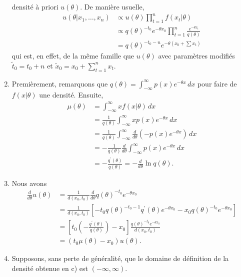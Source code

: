 \begin{exercice}
\begin{sol}
\begin{enumerate}
      densité à priori $u(\theta)$. De manière usuelle,
      \begin{align*}
        u(\theta|x_1, \dots, x_n)
        &\propto u(\theta) \prod_{t=1}^n f(x_t|\theta) \\
        &\propto q(\theta)^{-t_0} e^{-\theta x_0}
        \prod_{t=1}^n \frac{e^{-\theta x_t}}{q(\theta)} \\
        &= q(\theta)^{-t_0-n} e^{-\theta (x_0 + \sum x_t)}
      \end{align*}
      qui est, en effet, de la même famille que $u(\theta)$ avec
      paramètres modifiés $\tilde{t}_0 = t_0 + n$ et $\tilde{x}_0 =
      x_0 + \sum_{t=1}^n x_t$.
    \item Premièrement, remarquons que
      $q(\theta) = \int_{-\infty}^\infty p(x) e^{-\theta x}\, dx$ pour
      faire de $f(x|\theta)$ une densité. Ensuite,
      \begin{align*}
        \mu(\theta)
        &= \int_{-\infty}^\infty x f(x|\theta)\, dx \\
        &= \frac{1}{q(\theta)}
        \int_{-\infty}^\infty x p(x) e^{-\theta x}\, dx \\
        &= \frac{1}{q(\theta)} \int_{-\infty}^\infty
        \frac{d}{d\theta} (-p(x) e^{-\theta x})\, dx \\
        &= - \frac{1}{q(\theta)} \frac{d}{d\theta}
        \int_{-\infty}^\infty p(x) e^{-\theta x}\, dx \\
        &= - \frac{q^\prime(\theta)}{q(\theta)} = - \frac{d}{d\theta} \ln
        q(\theta).
      \end{align*}
    \item Nous avons
      \begin{align*}
        \frac{d}{d\theta} u(\theta) &= \frac{1}{d(x_0, t_0)}
        \frac{d}{d\theta} q(\theta)^{-t_0} e^{-\theta x_0} \\
        &= \frac{1}{d(x_0, t_0)} \left[ -t_0 q(\theta)^{-t_0-1}
          q^\prime(\theta) e^{-\theta x_0} - x_0 q(\theta)^{-t_0} e^{-\theta
            x_0}
        \right] \\
        &= \left[ t_0 \left( - \frac{q^\prime(\theta)}{q(\theta)} \right) -
          x_0 \right]
        \frac{q(\theta)^{-t_0} e^{-\theta x_0}}{d(x_0, t_0)} \\
        &= (t_0 \mu(\theta) - x_0) u(\theta).
      \end{align*}
    \item Supposons, sans perte de généralité, que le domaine de
      définition de la densité obtenue en c) est $(-\infty, \infty)$.

\end{enumerate}
\end{sol}
\end{exercice}

